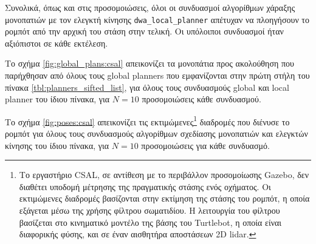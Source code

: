 Συνολικά, όπως και στις προσομοιώσεις, όλοι οι συνδυασμοί αλγορίθμων
χάραξης μονοπατιών με τον ελεγκτή κίνησης \texttt{dwa\_local\_planner}
απέτυχαν να πλοηγήσουν το ρομπότ από την αρχική του στάση στην τελική. Οι
υπόλοιποι συνδυασμοί ήταν αξιόπιστοι σε κάθε εκτέλεση.

Το σχήμα \ref{fig:global_plans:csal} απεικονίζει τα μονοπάτια προς
ακολούθηση που παρήχθησαν από όλους τους global planners που εμφανίζονται στην
πρώτη στήλη του πίνακα \ref{tbl:planners_sifted_list}, για όλους τους
συνδυασμούς global και local planner του ίδιου πίνακα, για $N=10$ προσομοιώσεις
κάθε συνδυασμού.

\begin{figure*}
\raggedright
  \begin{subfigure}[t]{\linewidth}\hspace{-1cm}
    
  \end{subfigure}%
  \vspace{-1.5cm}
  \begin{subfigure}[t]{\linewidth}\hspace{-1cm}
    
  \end{subfigure}%
  \vspace{-1.5cm}
  \begin{subfigure}[t]{\linewidth}\hspace{-1cm}
    
  \end{subfigure}%
  \caption{\small Τα σχεδιασθέντα μονοπάτια προς ακολούθηση $\bm{\mathcal{G}}$
           που παρήχθησαν από τους τρεις αλγορίθμους χάραξης μονοπατιών για
           κάθε συνδυασμό τους με ελεγκτή κίνησης του πίνακα
           \ref{tbl:planners_sifted_list}, σε σχέση με τις ορισμένες αρχικές και
           τελικές στάσεις του περιβάλλοντος CSAL}
  \label{fig:global_plans:csal}
\end{figure*}

Το σχήμα \ref{fig:poses:csal} απεικονίζει τις εκτιμώμενες\footnote{Το
εργαστήριο CSAL, σε αντίθεση με το περιβάλλον προσομοίωσης Gazebo, δεν διαθέτει
υποδομή μέτρησης της πραγματικής στάσης ενός οχήματος. Oι εκτιμώμενες διαδρομές
βασίζονται στην εκτίμηση της στάσης του ρομπότ, η οποία εξάγεται μέσω της
χρήσης φίλτρου σωματιδίου. Η λειτουργία του φίλτρου βασίζεται στο κινηματικό
μοντέλο της βάσης του Turtlebot, η οποία είναι διαφορικής φύσης, και σε έναν
αισθητήρα αποστάσεων 2D lidar.} διαδρομές που διένυσε το ρομπότ για όλους τους
συνδυασμούς αλγορίθμων σχεδίασης μονοπατιών και ελεγκτών κίνησης του ίδιου
πίνακα, για $N=10$ προσομοιώσεις για κάθε συνδυασμό.

